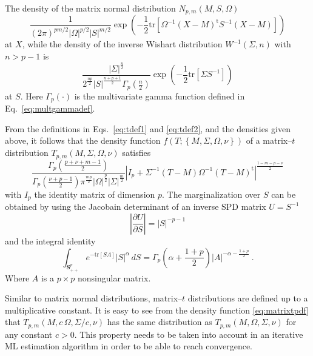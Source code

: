 \documentclass[english,listof=totoc]{scrartcl}
\begin{document}
The density of the matrix normal distribution $N_{p,m}(M,S,\Omega)$
\begin{equation}
\frac{1}{(2\pi)^{pm/2}|\Omega|^{p/2}|S|^{m/2}}%
\exp\left(-\frac{1}{2}\textrm{tr}\left[\Omega^{-1}(X-M)^{\textrm{t}}S^{-1}(X-M)\right]\right)
\label{eq:ndistpdf}
\end{equation}
at $X$,  while the density of the inverse Wishart distribution
$W^{-1}(\Sigma,n)$ with $n>p-1$ is
\begin{equation}
\frac{|\Sigma|^{\frac{n}{2}}}{2^{\frac{n p}{2}}%
|S|^{\frac{n+p+1}{2}}\Gamma_{p}(\frac{n}{2})}%
\exp\left(-\frac{1}{2}\textrm{tr}\left[\Sigma S^{-1}\right]\right)
\label{eq:wdistpdf}
\end{equation}
at $S$. Here $\Gamma_{p}(\cdot)$ is the multivariate gamma function
defined in Eq.~\eqref{eq:multgammadef}.

From the definitions in Eqs.~\eqref{eq:tdef1} and \eqref{eq:tdef2},
and the densities given above, it follows that the density function
$f(T;\left\{M,\Sigma,\Omega,\nu\right\})$ of a matrix--$t$
distribution $T_{p,m}(M,\Sigma,\Omega,\nu)$ satisfies
\begin{equation}
\frac{\Gamma_{p}\left(\frac{p+\nu+m-1}{2}\right)}%
{\Gamma_{p}\left(\frac{\nu+p-1}{2}\right)%
\pi^{\frac{mp}{2}}|\Omega|^{\frac{p}{2}}|\Sigma|^{\frac{m}{2}}}%
|I_p+\Sigma^{-1}(T-M)\Omega^{-1}(T-M)^{\textrm{t}}|^{\frac{1-m-p-\nu}{2}}
\label{eq:matrixtpdf}
\end{equation}
%
with $I_p$ the identity matrix of dimension $p$. The marginalization
over $S$ can be obtained by using the Jacobain determinant of an
inverse SPD matrix $U=S^{-1}$
%
\begin{equation}
\left|\frac{\partial U}{\partial S}\right|=|S|^{-p-1}
\end{equation}
and the integral identity \citep{gupta1999matrix}
\begin{equation}
\int_{\mathbf{S}_{++}^p}e^{-\textrm{tr}[S A]}|S|^{\alpha}\,dS=%
\Gamma_{p}\left(\alpha+\frac{1+p}{2}\right)|A|^{-\alpha-\frac{1+p}{2}}
\ .\label{eq:intmultgammadef}
\end{equation}
Where $A$ is a $p\times p$ nonsingular matrix.

Similar to matrix normal distributions, matrix--$t$ distributions are
defined up to a multiplicative constant. It is easy to see from the
density function \eqref{eq:matrixtpdf} that
$T_{p,m}(M,c\,\Omega,\Sigma/c,\nu)$ has the same distribution as
$T_{p,m}(M,\Omega,\Sigma,\nu)$ for any constant $c>0$. This property
needs to be taken into account in an iterative ML estimation algorithm
in order to be able to reach convergence.
\end{document}
